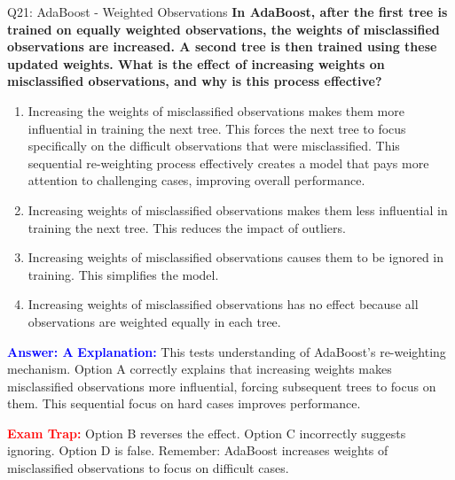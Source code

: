 \documentclass[8pt]{beamer}
\begin{document}
	\begin{frame}{Q21: AdaBoost - Weighted Observations}
		\fontsize{6.5}{7.5}\selectfont
		\textbf{In AdaBoost, after the first tree is trained on equally weighted observations, the weights of misclassified observations are increased. A second tree is then trained using these updated weights. What is the effect of increasing weights on misclassified observations, and why is this process effective?}
		
		\begin{enumerate}
			\item Increasing the weights of misclassified observations makes them more influential in training the next tree. This forces the next tree to focus specifically on the difficult observations that were misclassified. This sequential re-weighting process effectively creates a model that pays more attention to challenging cases, improving overall performance.
			\item Increasing weights of misclassified observations makes them less influential in training the next tree. This reduces the impact of outliers.
			\item Increasing weights of misclassified observations causes them to be ignored in training. This simplifies the model.
			\item Increasing weights of misclassified observations has no effect because all observations are weighted equally in each tree.
		\end{enumerate}
		
		\vspace{0.1cm}
		\textcolor{blue}{\textbf{Answer: A}}
		\vspace{0.1cm}
		\textcolor{blue}{\textbf{Explanation:}} This tests understanding of AdaBoost's re-weighting mechanism. Option A correctly explains that increasing weights makes misclassified observations more influential, forcing subsequent trees to focus on them. This sequential focus on hard cases improves performance.
		
		\textcolor{red}{\textbf{Exam Trap:}} Option B reverses the effect. Option C incorrectly suggests ignoring. Option D is false. Remember: AdaBoost increases weights of misclassified observations to focus on difficult cases.
	\end{frame}
	
\end{document}
